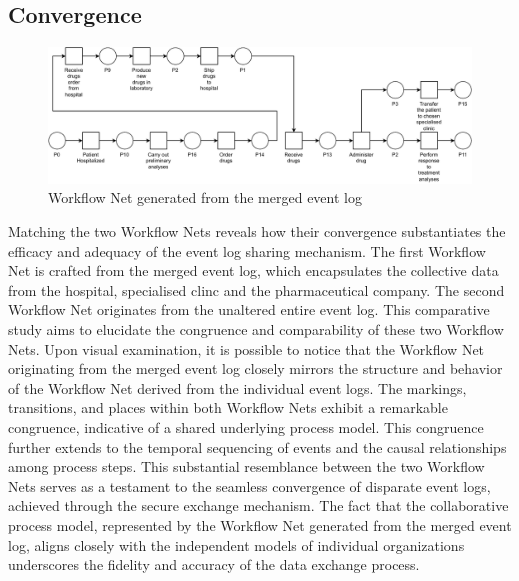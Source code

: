 \subsection{Convergence}

\begin{figure}[t]
\centering
\includegraphics[width=10 cm]{content/figures/merged_petri.pdf}
\caption{Workflow Net generated from the merged event log}
\label{fig:merged_petri}
\end{figure}

Matching the two Workflow Nets reveals how their convergence substantiates the efficacy and adequacy of the event log sharing mechanism. The first Workflow Net is crafted from the merged event log, which encapsulates the collective data from the hospital, specialised clinc and the pharmaceutical company. The second Workflow Net originates from the unaltered entire event log. This comparative study aims to elucidate the congruence and comparability of these two Workflow Nets.
Upon visual examination, it is possible to notice that the Workflow Net originating from the merged event log closely mirrors the structure and behavior of the Workflow Net derived from the individual event logs. The markings, transitions, and places within both Workflow Nets exhibit a remarkable congruence, indicative of a shared underlying process model. This congruence further extends to the temporal sequencing of events and the causal relationships among process steps. This substantial resemblance between the two Workflow Nets serves as a testament to the seamless convergence of disparate event logs, achieved through the secure exchange mechanism. The fact that the collaborative process model, represented by the Workflow Net generated from the merged event log, aligns closely with the independent models of individual organizations underscores the fidelity and accuracy of the data exchange process.
